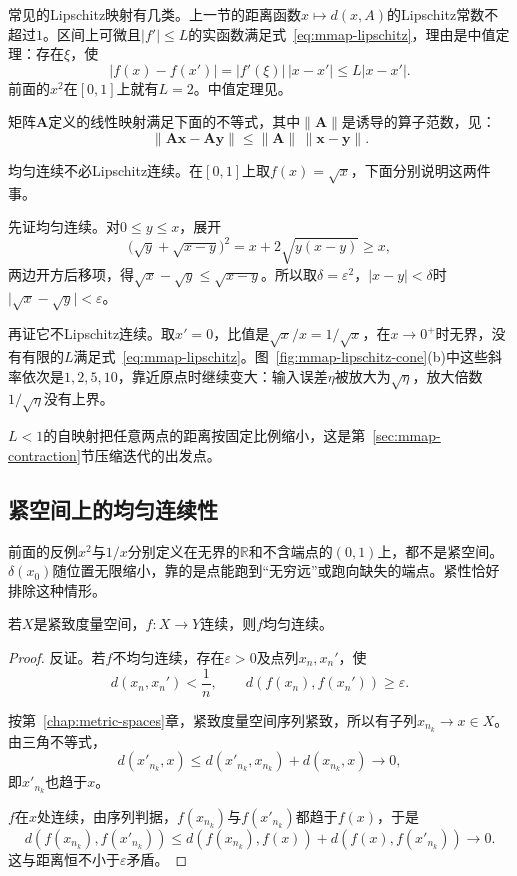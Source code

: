 常见的Lipschitz映射有几类。上一节的距离函数$x\mapsto d(x,A)$的Lipschitz常数不超过$1$。区间上可微且$\lvert f'\rvert\leq L$的实函数满足式~\eqref{eq:mmap-lipschitz}，理由是中值定理：存在$\xi$，使
\[
 \lvert f(x)-f(x')\rvert=\lvert f'(\xi)\rvert\,\lvert x-x'\rvert\leq L\lvert x-x'\rvert.
\]
前面的$x^2$在$[0,1]$上就有$L=2$。中值定理见。

矩阵$\bm A$定义的线性映射满足下面的不等式，其中$\lVert\bm A\rVert$是诱导的算子范数，见：
\[
 \lVert\bm A\bm x-\bm A\bm y\rVert\leq\lVert\bm A\rVert\,\lVert\bm x-\bm y\rVert.
\]

均匀连续不必Lipschitz连续。在$[0,1]$上取$f(x)=\sqrt x$，下面分别说明这两件事。

先证均匀连续。对$0\leq y\leq x$，展开
\[
 \bigl(\sqrt y+\sqrt{x-y}\bigr)^2=x+2\sqrt{y(x-y)}\geq x,
\]
两边开方后移项，得$\sqrt x-\sqrt y\leq\sqrt{x-y}$。所以取$\delta=\varepsilon^2$，$\lvert x-y\rvert<\delta$时$\lvert\sqrt x-\sqrt y\rvert<\varepsilon$。

再证它不Lipschitz连续。取$x'=0$，比值是$\sqrt x/x=1/\sqrt x$，在$x\to0^+$时无界，没有有限的$L$满足式~\eqref{eq:mmap-lipschitz}。图~\ref{fig:mmap-lipschitz-cone}(b)中这些斜率依次是$1,2,5,10$，靠近原点时继续变大：输入误差$\eta$被放大为$\sqrt\eta$，放大倍数$1/\sqrt\eta$没有上界。

$L<1$的自映射把任意两点的距离按固定比例缩小，这是第~\ref{sec:mmap-contraction}节压缩迭代的出发点。

\subsection{紧空间上的均匀连续性}
\label{sec:mmap-compact-uniform}

前面的反例$x^2$与$1/x$分别定义在无界的$\mathbb R$和不含端点的$(0,1)$上，都不是紧空间。$\delta(x_0)$随位置无限缩小，靠的是点能跑到“无穷远”或跑向缺失的端点。紧性恰好排除这种情形。

\begin{theorem}[紧空间上的均匀连续性]
\label{thm:mmap-compact-uniform}
若$X$是紧致度量空间，$f:X\to Y$连续，则$f$均匀连续。
\end{theorem}

\begin{proof}
反证。若$f$不均匀连续，存在$\varepsilon>0$及点列$x_n,x_n'$，使
\[
 d(x_n,x_n')<\frac1n,\qquad d(f(x_n),f(x_n'))\geq\varepsilon.
\]

按第~\ref{chap:metric-spaces}章，紧致度量空间序列紧致，所以有子列$x_{n_k}\to x\in X$。由三角不等式，
\[
 d(x'_{n_k},x)\leq d(x'_{n_k},x_{n_k})+d(x_{n_k},x)\to0,
\]
即$x'_{n_k}$也趋于$x$。

$f$在$x$处连续，由序列判据，$f(x_{n_k})$与$f(x'_{n_k})$都趋于$f(x)$，于是
\[
 d(f(x_{n_k}),f(x'_{n_k}))\leq d(f(x_{n_k}),f(x))+d(f(x),f(x'_{n_k}))\to0.
\]
这与距离恒不小于$\varepsilon$矛盾。
\end{proof}

